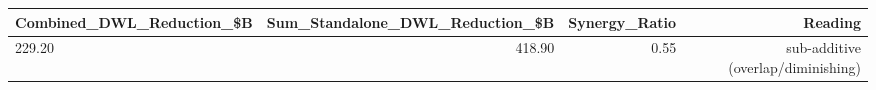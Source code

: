 

\begin{tabular}{@{}lrrr@{}}
\toprule
Combined\_DWL\_Reduction\_\$B & Sum\_Standalone\_DWL\_Reduction\_\$B & Synergy\_Ratio & Reading \\
\midrule
229.20 & 418.90 & 0.55 & sub-additive (overlap/diminishing) \\
\bottomrule
\end{tabular}